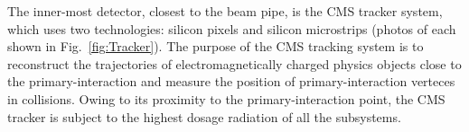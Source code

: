 
The inner-most detector, closest to the beam pipe, is the CMS tracker system, which uses two technologies: silicon pixels and silicon microstrips (photos of each shown in Fig.~\ref{fig:Tracker}). The purpose of the CMS tracking system is to reconstruct the trajectories of electromagnetically charged physics objects close to the primary-interaction and measure the position of primary-interaction verteces in collisions. Owing to its proximity to the primary-interaction point, the CMS tracker is subject to the highest dosage radiation of all the subsystems.

\begin{figure}[H]
    \centering
\end{figure}

